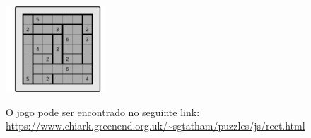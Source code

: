 \begin{enumerate}
\begin{center}
\includegraphics[scale=1.0]{images/Rectangles2.png} 
\end{center}

O jogo pode ser encontrado no seguinte link: \url{https://www.chiark.greenend.org.uk/~sgtatham/puzzles/js/rect.html}


\end{enumerate}


















